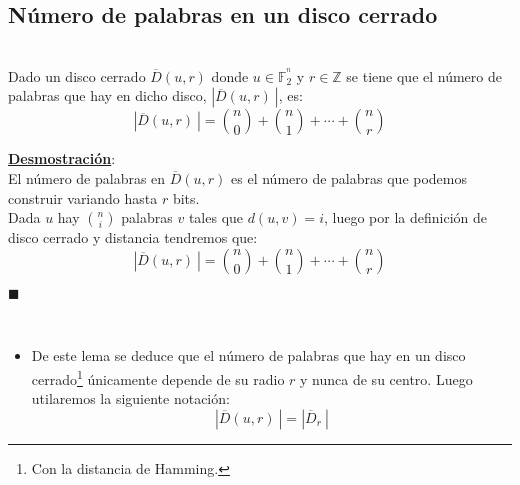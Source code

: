 % 
%

\subsection{N\'umero de palabras en un disco cerrado}

\begin{lema}\label{lem:Cantidad}
\ \\
Dado un disco cerrado $\overline{D}(u,r)$ donde $u\in\mathbb{F}^{^n}_2$ y
$r\in \mathbb{Z}$ se tiene que el n\'umero de palabras que hay en dicho
disco, $|\overline{D}(u,r)\ |$, es:
\begin{displaymath}
|\overline{D}(u,r)\ | = {n \choose 0}+{n \choose 1}+\cdots+{n\choose r}
\end{displaymath}
\end{lema}
\underline{\textbf{Desmostraci\'on}}:\\
El n\'umero de palabras en $\overline{D}(u,r)$ es el n\'umero de palabras que
podemos construir variando hasta $r$ bits.\\

Dada $u$ hay ${n \choose i}$ palabras $v$ tales que $d(u,v) = i$, luego por
la definici\'on de disco cerrado y distancia tendremos que:
\begin{displaymath}
|\overline{D}(u,r)\ | = {n\choose 0}+{n\choose 1}+\cdots+{n\choose r}
\end{displaymath}
\begin{flushright}
$\blacksquare$
\end{flushright}
\begin{observacion}\ \\
\begin{itemize}
\item De este lema se deduce que el n\'umero de palabras que hay en un disco
cerrado\footnote{Con la distancia de Hamming.} \'unicamente depende de su
radio $r$ y nunca de su centro. Luego utilaremos la siguiente notaci\'on:
\begin{displaymath}
|\overline{D}(u,r)\ | = |\overline{D}_r\ |
\end{displaymath}
\end{itemize}
\end{observacion}
